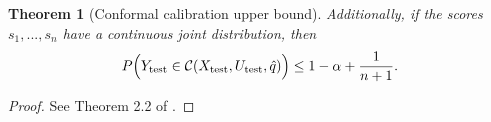 \documentclass[10pt]{article}
\newtheorem{theorem}{Theorem}
\newcommand{\C}{\mathcal{C}}
\begin{document}
\begin{theorem}[Conformal calibration upper bound]
\label{thm:upper-bound}
    Additionally, if the scores $s_1, ..., s_n$ have a continuous joint distribution, then
    \begin{equation*}
        P\Big(Y_{\rm test} \in \C(X_{\rm test}, U_{\rm test}, \hat{q})\Big) \leq 1 - \alpha + \frac{1}{n+1}.
    \end{equation*}
\end{theorem}

\begin{proof}
    See Theorem 2.2 of 
    \cite{lei2018distribution}.
\end{proof}
\end{document}
